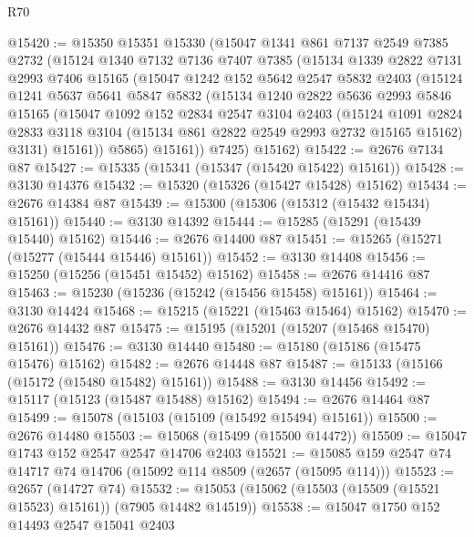 \begin{lexlean}{R70}
\begin{coremodule}
@15420 := @15350
    @15351
    @15330
    (@15047
      @1341
      @861
      @7137
      @2549
      @7385
      @2732
      (@15124
        @1340
        @7132
        @7136
        @7407
        @7385
        (@15134
          @1339
          @2822
          @7131
          @2993
          @7406
          @15165
          (@15047
            @1242
            @152
            @5642
            @2547
            @5832
            @2403
            (@15124
              @1241
              @5637
              @5641
              @5847
              @5832
              (@15134
                @1240
                @2822
                @5636
                @2993
                @5846
                @15165
                (@15047
                  @1092
                  @152
                  @2834
                  @2547
                  @3104
                  @2403
                  (@15124
                    @1091
                    @2824
                    @2833
                    @3118
                    @3104
                    (@15134 @861 @2822 @2549 @2993 @2732 @15165 @15162)
                    @3131)
                  @15161))
              @5865)
            @15161))
        @7425)
      @15162)
@15422 := @2676 @7134 @87
@15427 := @15335 (@15341 (@15347 (@15420 @15422) @15161))
@15428 := @3130 @14376
@15432 := @15320 (@15326 (@15427 @15428) @15162)
@15434 := @2676 @14384 @87
@15439 := @15300 (@15306 (@15312 (@15432 @15434) @15161))
@15440 := @3130 @14392
@15444 := @15285 (@15291 (@15439 @15440) @15162)
@15446 := @2676 @14400 @87
@15451 := @15265 (@15271 (@15277 (@15444 @15446) @15161))
@15452 := @3130 @14408
@15456 := @15250 (@15256 (@15451 @15452) @15162)
@15458 := @2676 @14416 @87
@15463 := @15230 (@15236 (@15242 (@15456 @15458) @15161))
@15464 := @3130 @14424
@15468 := @15215 (@15221 (@15463 @15464) @15162)
@15470 := @2676 @14432 @87
@15475 := @15195 (@15201 (@15207 (@15468 @15470) @15161))
@15476 := @3130 @14440
@15480 := @15180 (@15186 (@15475 @15476) @15162)
@15482 := @2676 @14448 @87
@15487 := @15133 (@15166 (@15172 (@15480 @15482) @15161))
@15488 := @3130 @14456
@15492 := @15117 (@15123 (@15487 @15488) @15162)
@15494 := @2676 @14464 @87
@15499 := @15078 (@15103 (@15109 (@15492 @15494) @15161))
@15500 := @2676 @14480
@15503 := @15068 (@15499 (@15500 @14472))
@15509 := @15047 @1743 @152 @2547 @2547 @14706 @2403
@15521 := @15085 @159 @2547 @74 @14717 @74 @14706 (@15092 @114 @8509 (@2657 (@15095 @114)))
@15523 := @2657 (@14727 @74)
@15532 := @15053 (@15062 (@15503 (@15509 (@15521 @15523) @15161)) (@7905 @14482 @14519))
@15538 := @15047 @1750 @152 @14493 @2547 @15041 @2403

\end{coremodule}
\end{lexlean}
